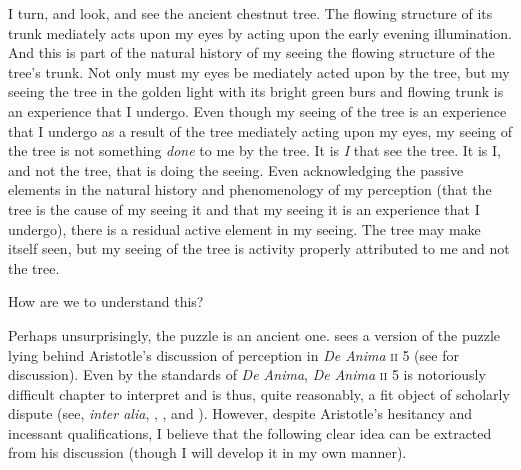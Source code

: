 \documentclass[12pt]{article}
\begin{document}
%

I turn, and look, and see the ancient chestnut tree. The flowing structure of its trunk mediately acts upon my eyes by acting upon the early evening illumination. And this is part of the natural history of my seeing the flowing structure of the tree's trunk. Not only must my eyes be mediately acted upon by the tree, but my seeing the tree in the golden light with its bright green burs and flowing trunk is an experience that I undergo. Even though my seeing of the tree is an experience that I undergo as a result of the tree mediately acting upon my eyes, my seeing of the tree is not something \emph{done} to me by the tree. It is \emph{I} that see the tree. It is I, and not the tree, that is doing the seeing. Even acknowledging the passive elements in the natural history and phenomenology of my perception (that the tree is the cause of my seeing it and that my seeing it is an experience that I undergo), there is a residual active element in my seeing. The tree may make itself seen, but my seeing of the tree is activity properly attributed to me and not the tree.

How are we to understand this?

Perhaps unsurprisingly, the puzzle is an ancient one. \citet[chapter 9.4.3]{Beere:2009vn} sees a version of the puzzle lying behind Aristotle's discussion of perception in \emph{De Anima} \textsc{ii} 5 (see \citealt[chapter 8]{Kalderon:2015fr} for discussion). Even by the standards of \emph{De Anima}, \emph{De Anima} \textsc{ii} 5 is notoriously difficult chapter to interpret and is thus, quite reasonably, a fit object of scholarly dispute (see, \emph{inter alia}, \citealt{Burnyeat:2002an}, \citealt{Heinaman:2007ys}, and \citealt{Bowin:2011uq}). However, despite Aristotle's hesitancy and incessant qualifications, I believe that the following clear idea can be extracted from his discussion (though I will develop it in my own manner). 
\end{document}
